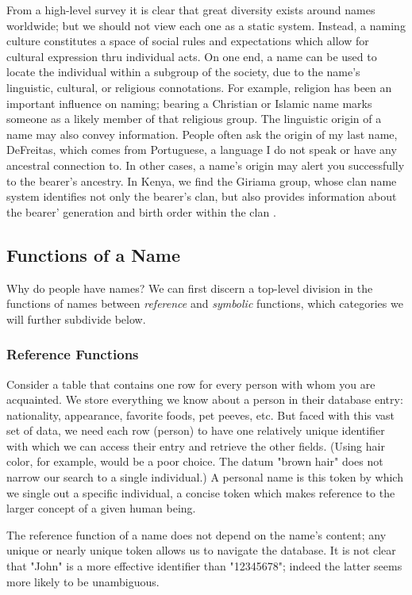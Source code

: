 From a high-level survey it is clear that great diversity exists around names
worldwide; but we should not view each one as a static system. Instead, a naming
culture constitutes a space of social rules and expectations which allow for
cultural expression thru individual acts. On one end, a name can be used to
locate the individual within a subgroup of the society, due to the name's
linguistic, cultural, or religious connotations. For example, religion has been
an important influence on naming; bearing a Christian or Islamic name marks
someone as a likely member of that religious group. The linguistic origin of a
name may also convey information. People often ask the origin of my last name,
DeFreitas, which comes from Portuguese, a language I do not speak or have any
ancestral connection to. In other cases, a name's origin may alert you
successfully to the bearer's ancestry. In Kenya, we find the Giriama group,
whose clan name system identifies not only the bearer's clan, but also provides
information about the bearer' generation and birth order within the clan
\textcite{parkin89}.


\subsection{Functions of a Name}

Why do people have names? We can first discern a top-level division in the
functions of names between \textit{reference} and \textit{symbolic} functions,
which categories we will further subdivide below.

\subsubsection{Reference Functions}

Consider a table that contains one row for every person with whom you are
acquainted. We store everything we know about a person in their database entry:
nationality, appearance, favorite foods, pet peeves, etc. But faced with this
vast set of data, we need each row (person) to have one relatively unique
identifier with which we can access their entry and retrieve the other fields.
(Using hair color, for example, would be a poor choice. The datum "brown hair"
does not narrow our search to a single individual.) A personal name is this
token by which we single out a specific individual, a concise token which makes
reference to the larger concept of a given human being.

The reference function of a name does not depend on the name's content; any
unique or nearly unique token allows us to navigate the database. It is not
clear that "John" is a more effective identifier than "12345678"; indeed the
latter seems more likely to be unambiguous.

